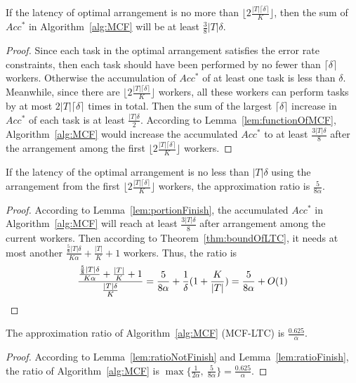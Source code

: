 \begin{lemma}
\label{lem:portionFinish}
If the latency of optimal arrangement is no more than $\lfloor 2\frac{|T|\lceil \delta \rceil}{K} \rfloor$, then the sum of $Acc^*$ in Algorithm~\ref{alg:MCF} will be at least $\frac{3}{8}|T|\delta$.
\end{lemma}
\begin{proof}
Since each task in the optimal arrangement satisfies the error rate constraints, then each task should have been performed by no fewer than $\lceil \delta \rceil$ workers.
Otherwise the accumulation of $Acc^*$ of at least one task is less than $\delta$.
Meanwhile, since there are $\lfloor 2\frac{|T|\lceil \delta \rceil}{K} \rfloor$ workers, all these workers can perform tasks by at most $2|T|\lceil \delta \rceil$ times in total.
Then the sum of the largest $\lceil \delta \rceil$ increase in $Acc^{*}$ of each task is at least $\frac{|T|\delta}{2}$.
According to Lemma~\ref{lem:functionOfMCF}, Algorithm~\ref{alg:MCF} would increase the accumulated $Acc^*$ to at least $\frac{3|T|\delta}{8}$ after the arrangement among the first $\lfloor 2\frac{|T|\lceil \delta \rceil}{K} \rfloor$ workers.
\end{proof}

\begin{lemma}
\label{lem:ratioFinish}
If the latency of the optimal arrangement is no less than $|T|\delta$ using the arrangement from the first $\lfloor 2\frac{|T|\lceil \delta \rceil }{K}\rfloor$ workers, the approximation ratio is $\frac{5}{8\alpha}$.
\end{lemma}
\begin{proof}
According to Lemma~\ref{lem:portionFinish}, the accumulated $Acc^*$ in Algorithm~\ref{alg:MCF} will reach at least $\frac{3|T|\delta}{8}$ after arrangement among the current workers.
Then according to Theorem~\ref{thm:boundOfLTC}, it needs at most another $\frac{\frac{5}{8}|T|\delta}{K\alpha} + \frac{|T|}{K} + 1$ workers.
Thus, the ratio is
\begin{equation*}
	\frac{\frac{\frac{5}{8}|T|\delta}{K\alpha} + \frac{|T|}{K} + 1}{\frac{|T|\delta}{K}} = \frac{5}{8\alpha} + \frac{1}{\delta}(1 + \frac{K}{|T|}) = \frac{5}{8\alpha} + O(1) \\
\end{equation*}
\end{proof}

\begin{theorem}
\label{thm:ratioOfMCF}
The approximation ratio of Algorithm~\ref{alg:MCF} (MCF-LTC) is $\frac{0.625}{\alpha}$.
\end{theorem}
\begin{proof}
According to Lemma~\ref{lem:ratioNotFinish} and Lemma~\ref{lem:ratioFinish}, the ratio of Algorithm~\ref{alg:MCF} is
$\max\{\frac{1}{2\alpha},\ \frac{5}{8\alpha}\} = \frac{0.625}{\alpha}$.
\end{proof}

